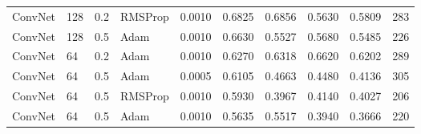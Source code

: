 \begin{landscape}
\begin{table}
\begin{tabular}{l|l|l|l|l|l|l|l|l|l}
    ConvNet & 128 & 0.2 & RMSProp & 0.0010 & 0.6825 & 0.6856 & 0.5630 & 0.5809 & 283 \\
    ConvNet & 128 & 0.5 & Adam & 0.0010 & 0.6630 & 0.5527 & 0.5680 & 0.5485 & 226 \\
    ConvNet & 64 & 0.2 & Adam & 0.0010 & 0.6270 & 0.6318 & 0.6620 & 0.6202 & 289 \\
    ConvNet & 64 & 0.5 & Adam & 0.0005 & 0.6105 & 0.4663 & 0.4480 & 0.4136 & 305 \\
    ConvNet & 64 & 0.5 & RMSProp & 0.0010 & 0.5930 & 0.3967 & 0.4140 & 0.4027 & 206 \\
    ConvNet & 64 & 0.5 & Adam & 0.0010 & 0.5635 & 0.5517 & 0.3940 & 0.3666 & 220
    \end{tabular}
    \label{fig:convnet-results}
\end{table}
\end{landscape}